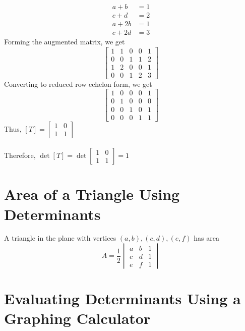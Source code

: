 \documentclass[letterpaper,12pt]{article}
\begin{document}
\begin{example}
\begin{align*}
    a + b & = 1 \\
    c + d & = 2 \\
    a + 2b & = 1 \\
    c + 2d & = 3
\end{align*}
Forming the augmented matrix, we get
\begin{equation*}
    \begin{bmatrix}
    1 & 1 & 0 & 0 & 1 \\
    0 & 0 & 1 & 1 & 2 \\
    1 & 2 & 0 & 0 & 1 \\
    0 & 0 & 1 & 2 & 3
    \end{bmatrix}
\end{equation*}
Converting to reduced row echelon form, we get
\begin{equation*}
    \begin{bmatrix}
    1 & 0 & 0 & 0 & 1 \\
    0 & 1 & 0 & 0 & 0 \\
    0 & 0 & 1 & 0 & 1 \\
    0 & 0 & 0 & 1 & 1
    \end{bmatrix}
\end{equation*}
Thus, $[T] = \begin{bmatrix} 1 & 0 \\ 1 & 1 \end{bmatrix}$
\\ \\ Therefore, $\det{[T]} = \det{\begin{bmatrix} 1 & 0 \\ 1 & 1 \end{bmatrix}} = 1$
\end{example}

\section*{Area of a Triangle Using Determinants}
\begin{theorem}
A triangle in the plane with vertices $(a,b), (c,d), (e,f)$ has area
\begin{equation*}
    A = \frac{1}{2} \begin{vmatrix} a & b & 1 \\ c & d & 1 \\ e & f & 1 \end{vmatrix}
\end{equation*}
\end{theorem}

\section*{Evaluating Determinants Using a Graphing Calculator}
\end{document}
